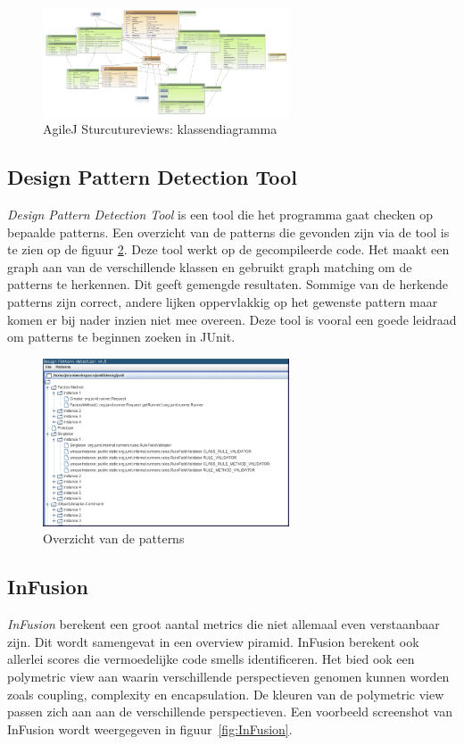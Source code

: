 \documentclass[i1]{oss}
\begin{document}
\begin{figure}[h!]
	\centering
	\includegraphics[width=0.65\textwidth]{AgileJKlassendiagramma}
	\caption{AgileJ Sturcutureviews: klassendiagramma}
	\label{fig:AgileJKlassendia}
\end{figure}

\subsection{Design Pattern Detection Tool}
\emph{Design Pattern Detection Tool} is een tool die het programma gaat checken op bepaalde patterns. Een overzicht van de patterns die gevonden zijn via de tool is te zien op de figuur \ref{fig:DesignPatterns}. Deze tool werkt op de gecompileerde code. Het maakt een graph aan van de verschillende klassen en gebruikt graph matching om de patterns te herkennen.  Dit geeft gemengde resultaten. Sommige van de herkende patterns zijn correct, andere lijken oppervlakkig op het gewenste pattern maar komen er bij nader inzien niet mee overeen. 
Deze tool is vooral een goede leidraad om patterns te beginnen zoeken in JUnit.\\

\begin{figure}[h!]
	\centering
	\includegraphics[width=0.65\textwidth]{Patterns1}
	\caption{Overzicht van de patterns}
	\label{fig:DesignPatterns}
\end{figure}

\subsection{InFusion}
\emph{InFusion} berekent een groot aantal metrics die niet allemaal even verstaanbaar zijn. Dit wordt samengevat in een overview piramid. InFusion berekent ook allerlei scores die vermoedelijke code smells identificeren. Het bied ook een polymetric view aan waarin verschillende perspectieven genomen kunnen worden zoals coupling, complexity en encapsulation. De kleuren van de polymetric view passen zich aan aan de verschillende perspectieven. Een voorbeeld screenshot van InFusion wordt weergegeven in figuur~\ref{fig:InFusion}.
\end{document}
